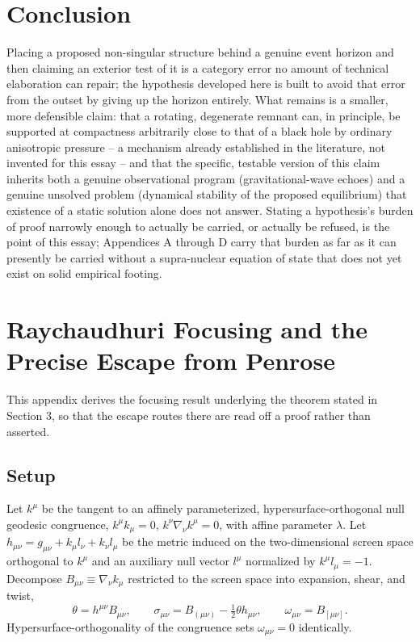 \documentclass[11pt]{article}
\begin{document}
\section{Conclusion}

Placing a proposed non-singular structure behind a genuine event horizon and then claiming an exterior test of it is a category error no amount of technical elaboration can repair; the hypothesis developed here is built to avoid that error from the outset by giving up the horizon entirely. What remains is a smaller, more defensible claim: that a rotating, degenerate remnant can, in principle, be supported at compactness arbitrarily close to that of a black hole by ordinary anisotropic pressure -- a mechanism already established in the literature, not invented for this essay -- and that the specific, testable version of this claim inherits both a genuine observational program (gravitational-wave echoes) and a genuine unsolved problem (dynamical stability of the proposed equilibrium) that existence of a static solution alone does not answer. Stating a hypothesis's burden of proof narrowly enough to actually be carried, or actually be refused, is the point of this essay; Appendices A through D carry that burden as far as it can presently be carried without a supra-nuclear equation of state that does not yet exist on solid empirical footing.

\appendix

\section{Raychaudhuri Focusing and the Precise Escape from Penrose}
\label{app:raychaudhuri}

This appendix derives the focusing result underlying the theorem stated in Section 3, so that the escape routes there are read off a proof rather than asserted.

\subsection{Setup}

Let $k^\mu$ be the tangent to an affinely parameterized, hypersurface-orthogonal null geodesic congruence, $k^\mu k_\mu = 0$, $k^\nu\nabla_\nu k^\mu = 0$, with affine parameter $\lambda$. Let $h_{\mu\nu} = g_{\mu\nu} + k_\mu l_\nu + k_\nu l_\mu$ be the metric induced on the two-dimensional screen space orthogonal to $k^\mu$ and an auxiliary null vector $l^\mu$ normalized by $k^\mu l_\mu = -1$. Decompose $B_{\mu\nu} \equiv \nabla_\nu k_\mu$ restricted to the screen space into expansion, shear, and twist,
\begin{equation}
\theta = h^{\mu\nu}B_{\mu\nu}, \qquad \sigma_{\mu\nu} = B_{(\mu\nu)} - \tfrac12\theta h_{\mu\nu}, \qquad \omega_{\mu\nu} = B_{[\mu\nu]}.
\end{equation}
Hypersurface-orthogonality of the congruence sets $\omega_{\mu\nu}=0$ identically.
\end{document}
